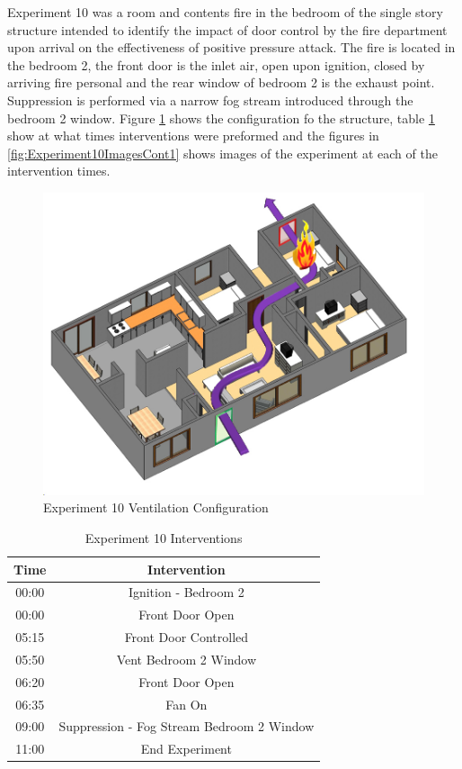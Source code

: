 \documentclass{article}
\begin{document}
Experiment 10 was a room and contents fire in the bedroom of the single story structure intended to identify the impact of door control by the fire department upon arrival on the effectiveness of positive pressure attack. The fire is located in the bedroom 2, the front door is the inlet air, open upon ignition, closed by arriving fire personal and the rear window of bedroom 2 is the exhaust point. Suppression is performed via a narrow fog stream introduced through the bedroom 2 window. Figure \ref{fig:Exp10VentConfig} shows the configuration fo the structure, table \ref{Table:Exp10Interventions} show at what times interventions were preformed and the figures in \ref{fig:Experiment10ImagesCont1} shows images of the experiment at each of the intervention times.

\begin{figure}[h!]
	\centering
	\includegraphics[width=5in]{0_Images/FireExperiments/Single_Story/Experiment_10.jpg}
	\caption{Experiment 10 Ventilation Configuration}
	\label{fig:Exp10VentConfig}
\end{figure}

\begin{table}[H]
	\centering
	\caption{Experiment 10 Interventions}
	\begin{tabular}{|c|c|} 
		\hline
		Time & Intervention \\ \hline \hline
		00:00 & Ignition - Bedroom 2 \\ \hline
		00:00 & Front Door Open \\ \hline
		05:15 & Front Door Controlled \\ \hline
		05:50 & Vent Bedroom 2 Window\\ \hline
		06:20 & Front Door Open \\ \hline
		06:35 & Fan On \\ \hline
		09:00 & Suppression - Fog Stream Bedroom 2 Window\\ \hline
		11:00 & End Experiment\\ \hline
	\end{tabular}
	\label{Table:Exp10Interventions}
\end{table}
\end{document}
